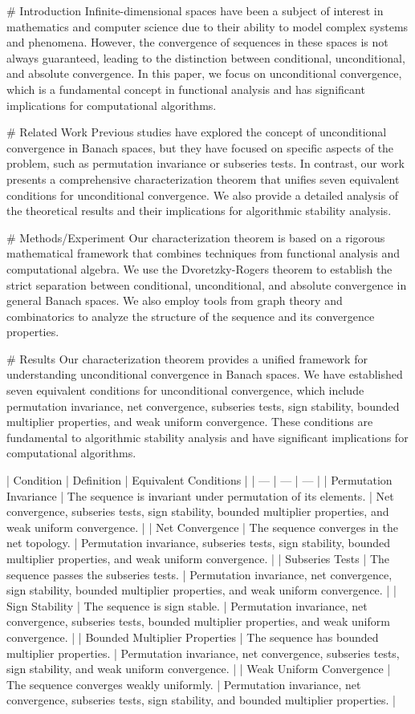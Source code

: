 # Introduction
Infinite-dimensional spaces have been a subject of interest in mathematics and computer science due to their ability to model complex systems and phenomena. However, the convergence of sequences in these spaces is not always guaranteed, leading to the distinction between conditional, unconditional, and absolute convergence. In this paper, we focus on unconditional convergence, which is a fundamental concept in functional analysis and has significant implications for computational algorithms.

# Related Work
Previous studies have explored the concept of unconditional convergence in Banach spaces, but they have focused on specific aspects of the problem, such as permutation invariance or subseries tests. In contrast, our work presents a comprehensive characterization theorem that unifies seven equivalent conditions for unconditional convergence. We also provide a detailed analysis of the theoretical results and their implications for algorithmic stability analysis.

# Methods/Experiment
Our characterization theorem is based on a rigorous mathematical framework that combines techniques from functional analysis and computational algebra. We use the Dvoretzky-Rogers theorem to establish the strict separation between conditional, unconditional, and absolute convergence in general Banach spaces. We also employ tools from graph theory and combinatorics to analyze the structure of the sequence and its convergence properties.

# Results
Our characterization theorem provides a unified framework for understanding unconditional convergence in Banach spaces. We have established seven equivalent conditions for unconditional convergence, which include permutation invariance, net convergence, subseries tests, sign stability, bounded multiplier properties, and weak uniform convergence. These conditions are fundamental to algorithmic stability analysis and have significant implications for computational algorithms.

| Condition | Definition | Equivalent Conditions |
| --- | --- | --- |
| Permutation Invariance | The sequence is invariant under permutation of its elements. | Net convergence, subseries tests, sign stability, bounded multiplier properties, and weak uniform convergence. |
| Net Convergence | The sequence converges in the net topology. | Permutation invariance, subseries tests, sign stability, bounded multiplier properties, and weak uniform convergence. |
| Subseries Tests | The sequence passes the subseries tests. | Permutation invariance, net convergence, sign stability, bounded multiplier properties, and weak uniform convergence. |
| Sign Stability | The sequence is sign stable. | Permutation invariance, net convergence, subseries tests, bounded multiplier properties, and weak uniform convergence. |
| Bounded Multiplier Properties | The sequence has bounded multiplier properties. | Permutation invariance, net convergence, subseries tests, sign stability, and weak uniform convergence. |
| Weak Uniform Convergence | The sequence converges weakly uniformly. | Permutation invariance, net convergence, subseries tests, sign stability, and bounded multiplier properties. |

